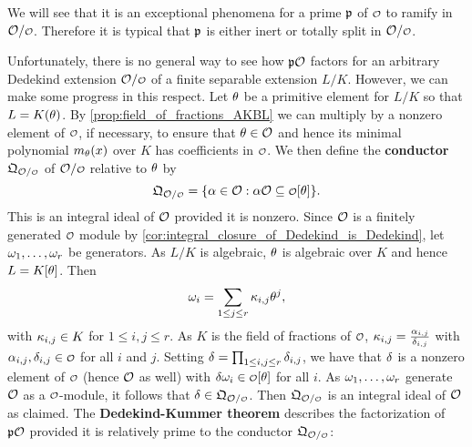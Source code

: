     \begin{remark}
      We will see that it is an exceptional phenomena for a prime $\mathfrak{p}$ of $\smc{O}$ to ramify in $\mc{O}/\smc{O}$. Therefore it is typical that $\mathfrak{p}$ is either inert or totally split in $\mc{O}/\smc{O}$.
    \end{remark}

    Unfortunately, there is no general way to see how $\mathfrak{p}\mathcal{O}$ factors for an arbitrary Dedekind extension $\mc{O}/\smc{O}$ of a finite separable extension $L/K$. However, we can make some progress in this respect. Let $\theta$ be a primitive element for $L/K$ so that $L = K(\theta)$. By \cref{prop:field_of_fractions_AKBL} we can multiply by a nonzero element of $\smc{O}$, if necessary, to ensure that $\theta \in \mathcal{O}$ and hence its minimal polynomial $m_{\theta}(x)$ over $K$ has coefficients in $\smc{O}$. We then define the \textbf{conductor} $\mf{Q}_{\mc{O}/\smc{O}}$ of $\mc{O}/\smc{O}$ relative to $\theta$ by
    \[
      \mf{Q}_{\mc{O}/\smc{O}} = \{\a \in \mc{O}:\a\mc{O} \subseteq \smc{O}[\t]\}.
    \]
    This is an integral ideal of $\mathcal{O}$ provided it is nonzero. Since $\mathcal{O}$ is a finitely generated $\smc{O}$ module by \cref{cor:integral_closure_of_Dedekind_is_Dedekind}, let $\omega_{1},\ldots,\omega_{r}$ be generators. As $L/K$ is algebraic, $\theta$ is algebraic over $K$ and hence $L = K[\theta]$. Then
    \[
      \omega_{i} = \sum_{1 \le j \le r}\kappa_{i,j}\theta^{j},
    \]
    with $\kappa_{i,j} \in K$ for $1 \le i,j \le r$. As $K$ is the field of fractions of $\smc{O}$, $\kappa_{i,j} = \frac{\alpha_{i,j}}{\delta_{i,j}}$ with $\a_{i,j},\d_{i,j} \in \smc{O}$ for all $i$ and $j$. Setting $\delta = \prod_{1 \le i,j \le r}\delta_{i,j}$, we have that $\delta$ is a nonzero element of $\smc{O}$ (hence $\mathcal{O}$ as well) with $\d\w_{i} \in \smc{O}[\t]$ for all $i$. As $\omega_{1},\ldots,\omega_{r}$ generate $\mathcal{O}$ as a $\smc{O}$-module, it follows that $\d \in \mf{Q}_{\mc{O}/\smc{O}}$. Then $\mf{Q}_{\mc{O}/\smc{O}}$ is an integral ideal of $\mathcal{O}$ as claimed. The \textbf{Dedekind-Kummer theorem} describes the factorization of $\mathfrak{p}\mathcal{O}$ provided it is relatively prime to the conductor $\mf{Q}_{\mc{O}/\smc{O}}$:

